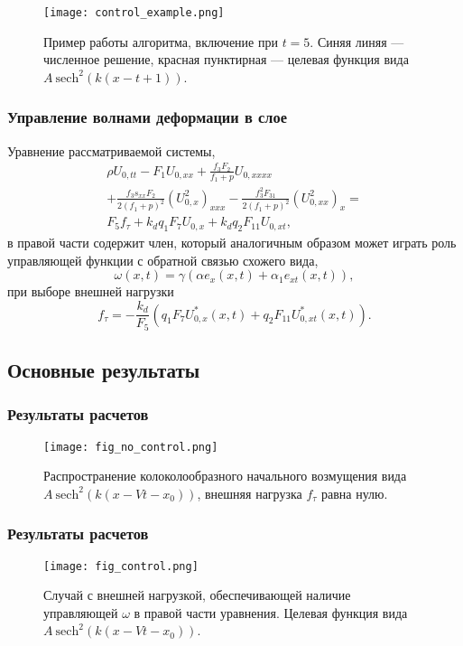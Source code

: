 \begin{frame}
	\begin{figure}
		\begin{center}
			\texttt{[image: control\_example.png]}
		\end{center}
		Пример работы алгоритма, включение при $t = 5$. Синяя линяя --- численное решение, красная пунктирная --- целевая функция вида $A~ {\text{sech}}^2(k (x- t+1))$.
	\end{figure}
\end{frame}

\begin{frame}
	\frametitle{Управление волнами деформации в слое}

Уравнение рассматриваемой системы,
\begin{multline*}
	\rho U_{0,tt}- F_1 U_{0,xx}+ \frac{f_3 F_2}{f_1+p}U_{0,xxxx}\\+\frac{f_3 s_{xx} F_{2}}{2(f_1+p)^2} (U_{0,x}^2)_{xxx}
	-\frac{f_3^2 F_{31}}{2(f_1+p)^2} (U_{0,xx}^2)_{x}=\\
	F_5 f_\tau+k_d q_1 F_7 U_{0,x} + k_d q_2 F_{11}U _{0,xt},
\end{multline*}
в правой части содержит член, который аналогичным образом может играть роль управляющей функции с обратной связью схожего вида,
$$
\omega(x,t)=\gamma \left(\alpha e_x(x,t)+\alpha_1 e_{xt}(x,t)\right),
$$
при выборе внешней нагрузки
$$
f_\tau=-\frac{k_d}{F_5}\left(q_1 F_7 U^*_{0,x}(x,t)+  q_2 F_{11} U_{0,xt}^*(x,t)\right).
$$
\end{frame}	

\subsection{Основные результаты}
\frametitle{Результаты расчетов}
\begin{frame}
	\begin{figure}
		\begin{center}
			\texttt{[image: fig\_no\_control.png]}
		\end{center}
		Распространение колоколообразного начального возмущения вида $A~{\text{sech}}^2 (k (x-V t-x_0))$, внешняя нагрузка $f_\tau$ равна нулю.
	\end{figure}
\end{frame}

\begin{frame}
	\frametitle{Результаты расчетов}
	\begin{figure}
		\begin{center}
			\texttt{[image: fig\_control.png]}
		\end{center}
		Случай с внешней нагрузкой, обеспечивающей наличие управляющей $\omega$ в правой части уравнения. Целевая функция вида $A~{\text{sech}}^2 (k (x-V t-x_0))$.
	\end{figure}
\end{frame}

